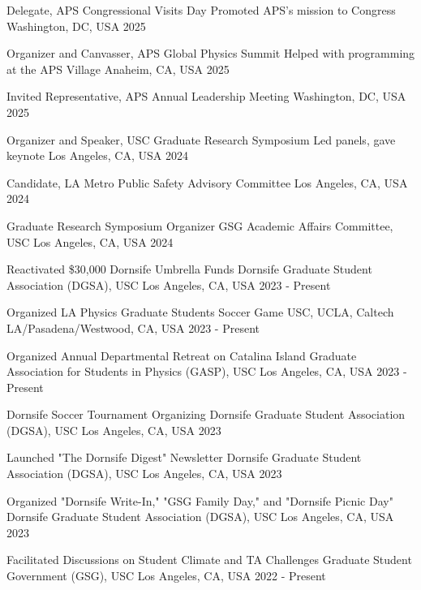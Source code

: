 
\begin{cvhonors}

    \cvhonor
    {Delegate, APS Congressional Visits Day}
    {Promoted APS's mission to Congress}
    {Washington, DC, USA}
    {2025}

    \cvhonor
    {Organizer and Canvasser, APS Global Physics Summit}
    {Helped with programming at the APS Village}
    {Anaheim, CA, USA}
    {2025}

    \cvhonor
    {Invited Representative, APS Annual Leadership Meeting}
    {}
    {Washington, DC, USA}
    {2025}

    \cvhonor
    {Organizer and Speaker, USC Graduate Research Symposium}
    {Led panels, gave keynote}
    {Los Angeles, CA, USA}
    {2024}

    \cvhonor
    {Candidate, LA Metro Public Safety Advisory Committee}
    {}
    {Los Angeles, CA, USA}
    {2024}

    \cvhonor
    {Graduate Research Symposium Organizer}
    {GSG Academic Affairs Committee, USC}
    {Los Angeles, CA, USA}
    {2024}

    \cvhonor
    {Reactivated \$30,000 Dornsife Umbrella Funds}
    {Dornsife Graduate Student Association (DGSA), USC}
    {Los Angeles, CA, USA}
    {2023 - Present}

    \cvhonor
    {Organized LA Physics Graduate Students Soccer Game}
    {USC, UCLA, Caltech}
    {LA/Pasadena/Westwood, CA, USA}
    {2023 - Present}

    \cvhonor
    {Organized Annual Departmental Retreat on Catalina Island}
    {Graduate Association for Students in Physics (GASP), USC}
    {Los Angeles, CA, USA}
    {2023 - Present}

    \cvhonor
    {Dornsife Soccer Tournament Organizing}
    {Dornsife Graduate Student Association (DGSA), USC}
    {Los Angeles, CA, USA}
    {2023}

    \cvhonor
    {Launched "The Dornsife Digest" Newsletter}
    {Dornsife Graduate Student Association (DGSA), USC}
    {Los Angeles, CA, USA}
    {2023}

    \cvhonor
    {Organized "Dornsife Write-In," "GSG Family Day," and "Dornsife Picnic Day"}
    {Dornsife Graduate Student Association (DGSA), USC}
    {Los Angeles, CA, USA}
    {2023}

    \cvhonor
    {Facilitated Discussions on Student Climate and TA Challenges}
    {Graduate Student Government (GSG), USC}
    {Los Angeles, CA, USA}
    {2022 - Present}


\end{cvhonors}
